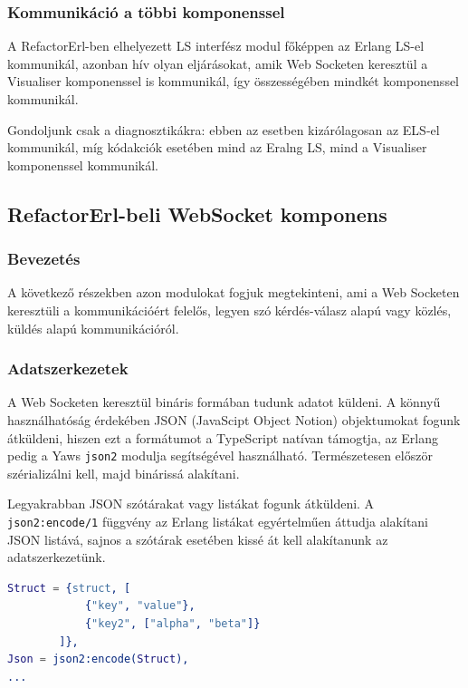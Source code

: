 \subsubsection{Kommunikáció a többi komponenssel}

A RefactorErl-ben elhelyezett LS interfész modul főképpen az Erlang LS-el kommunikál, azonban hív olyan eljárásokat, amik Web Socketen keresztül a Visualiser komponenssel is kommunikál, így összességében mindkét komponenssel kommunikál.

Gondoljunk csak a diagnosztikákra: ebben az esetben kizárólagosan az ELS-el kommunikál, míg kódakciók esetében mind az Eralng LS, mind a Visualiser komponenssel kommunikál.



\subsection{RefactorErl-beli WebSocket komponens}

\subsubsection{Bevezetés}
A következő részekben azon modulokat fogjuk megtekinteni, ami a Web Socketen keresztüli a kommunikációért felelős, legyen szó kérdés-válasz alapú vagy közlés, küldés alapú kommunikációról.

\subsubsection{Adatszerkezetek}
A Web Socketen keresztül bináris formában tudunk adatot küldeni. A könnyű használhatóság érdekében JSON (JavaScipt Object Notion) objektumokat fogunk átküldeni, hiszen ezt a formátumot a TypeScript natívan támogtja, az Erlang pedig a Yaws \lstinline{json2} modulja segítségével használható. Természetesen először szérializálni kell, majd binárissá alakítani.

Legyakrabban JSON szótárakat vagy listákat fogunk átküldeni. A \lstinline{json2:encode/1} függvény az Erlang listákat egyértelműen áttudja alakítani JSON listává, sajnos a szótárak esetében kissé át kell alakítanunk az adatszerkezetünk.

\lstset{caption=Példa szótárak átalakítása, label=src:erlang} \label{mapConvertJson}
\begin{lstlisting}[language={erlang}] 
Struct = {struct, [
            {"key", "value"}, 
            {"key2", ["alpha", "beta"]}
        ]},
Json = json2:encode(Struct),
...
\end{lstlisting}

